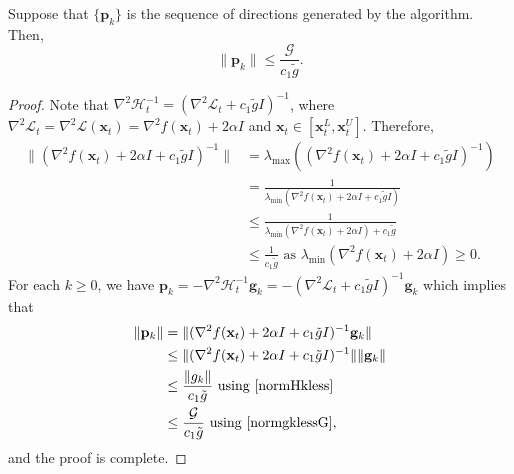 \documentclass{elsarticle}
\numberwithin{equation}{section}
\begin{document}
{\begin{lemma}\label{normpklessc1gk}
    Suppose that $\{\mathbf{p}_{k}\}$ is the sequence of directions generated by the algorithm. Then, 
    \[
    \lVert \mathbf{p}_{k}\rVert \leq  \frac{\mathcal{G}}{ c_1\tilde g}.
    \]
\end{lemma}
\begin{proof}
Note that $\nabla^{2}\mathcal{H}^{-1}_{t}=(\nabla^{2}\mathcal{L}_{t}+c_1\tilde g I)^{-1}$, where $\nabla^{2}\mathcal{L}_{t}=\nabla^{2}\mathcal{L}(\mathbf{x}_{t})=\nabla^{2} f(\mathbf{x}_{t})+2\alpha I$ and $\mathbf{x}_{t}\in
    [\mathbf{x}^{L}_{t}, \mathbf{x}^{U}_{t}]$. Therefore, 
    \begin{align}
    \lVert (\nabla^{2} f(\mathbf{x}_{t})+2\alpha I+c_1\tilde g I)^{-1}\rVert
        &=\lambda_{\max} \left((\nabla^{2} f(\mathbf{x}_{t})+2\alpha I+c_1\tilde g I)^{-1}\right)\nonumber\\
        &=\frac{1}{\lambda_{\min} \left(\nabla^{2} f(\mathbf{x}_{t})+2\alpha I+c_1\tilde g I\right)}\nonumber\\
        & \leq \frac{1}{\lambda_{\min} \left(\nabla^{2} f(\mathbf{x}_{t})+2\alpha I\right)+c_1\tilde g } \label{lemma:regularization_effect}\\
        &\leq \frac{1}{c_1\tilde g } \text{ as } \lambda_{\min} \left(\nabla^{2} f(\mathbf{x}_{t})+2\alpha I\right)\geq 0\label{normHkless}.
    \end{align}
    For each $k\geq0$, we have $\mathbf{p}_{k}=-\nabla^{2}\mathcal{H}^{-1}_{t}\mathbf{g}_k=-(\nabla^{2}\mathcal{L}_{t}+c_1\tilde g I)^{-1}\mathbf{g}_k$  which implies that 
    \begin{align}\label{pklessinvres}
        \lVert \mathbf{p}_{k}\rVert & =\lVert (\nabla^{2} f(\mathbf{x}_{t})+2\alpha I+c_1\tilde g I)^{-1} \mathbf{g}_k\rVert\nonumber\\
        & \leq   \lVert (\nabla^{2} f(\mathbf{x}_{t})+2\alpha I+c_1\tilde g I)^{-1}\rVert \lVert \mathbf{g}_k\rVert \\ 
        & \leq \frac{\lVert g_k\rVert}{c_1\tilde g } \text{ using } \eqref{normHkless}\nonumber\\
        & \leq \frac{\mathcal{G}}{ c_1\tilde g}\text{ using } \eqref{normgklessG}\nonumber,
    \end{align}
    and the proof is complete.
\end{proof}



}
\end{document}
